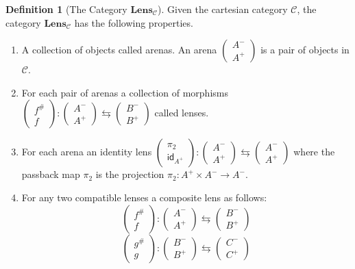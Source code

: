 \documentclass[12pt]{article}
\theoremstyle{definition}
\newtheorem{definition}{Definition}
\begin{document}
\begin{definition}[The Category $\textbf{Lens}_\mathcal{C}$]
    Given the cartesian category $\mathcal{C}$, the category $\textbf{Lens}_{\mathcal{C}}$ has the following properties.
    \begin{enumerate}
        \item A collection of objects called arenas. An arena $\begin{pmatrix}A^-\\A^+\end{pmatrix}$ is a pair of objects in $\mathcal{C}$.
        \item For each pair of arenas a collection of morphisms $\begin{pmatrix}f^{\#}\\f\end{pmatrix}:\begin{pmatrix}A^-\\A^+\end{pmatrix}\leftrightarrows\begin{pmatrix}B^-\\B^+\end{pmatrix}$ called lenses.
        \item For each arena an identity lens $\begin{pmatrix}\pi_2\\\mathsf{id}_{A^+}\end{pmatrix}:\begin{pmatrix}A^-\\A^+\end{pmatrix}\leftrightarrows\begin{pmatrix}A^-\\A^+\end{pmatrix}$ where the passback map $\pi_2$ is the projection $\pi_2:A^+ \times A^- \rightarrow A^-$.
        \item For any two compatible lenses a composite lens as follows:
              $$\begin{pmatrix}f^{\#}\\f\end{pmatrix}:\begin{pmatrix}A^-\\A^+\end{pmatrix}\leftrightarrows\begin{pmatrix}B^-\\B^+\end{pmatrix}$$
              $$\begin{pmatrix}g^{\#}\\g\end{pmatrix}:\begin{pmatrix}B^-\\B^+\end{pmatrix}\leftrightarrows\begin{pmatrix}C^-\\C^+\end{pmatrix}$$

\end{enumerate}
\end{definition}
\end{document}
